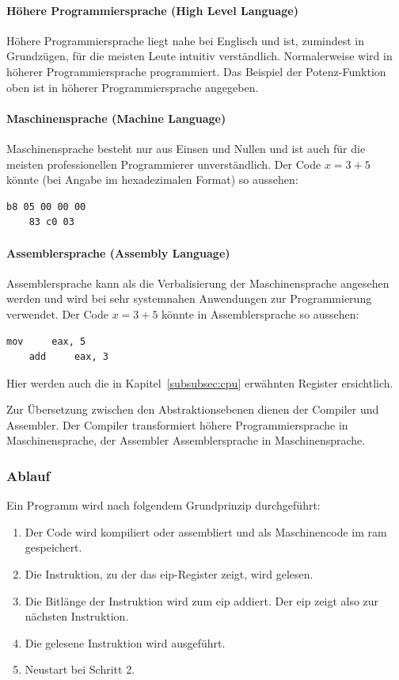 \documentclass[11pt, a4paper]{article}
\begin{document}
\paragraph{Höhere Programmiersprache (High Level Language)}
Höhere Programmiersprache liegt nahe bei Englisch und ist, zumindest in Grundzügen, für die meisten Leute intuitiv verständlich. Normalerweise wird in höherer Programmiersprache programmiert. Das Beispiel der Potenz-Funktion oben ist in höherer Programmiersprache angegeben.
\paragraph{Maschinensprache (Machine Language)}
Maschinensprache besteht nur aus Einsen und Nullen und ist auch für die meisten professionellen Programmierer unverständlich. Der Code \(x = 3 + 5\) könnte (bei Angabe im hexadezimalen Format) so aussehen: 
\begin{lstlisting}[style=LowLevelStyle]
	b8 05 00 00 00
	83 c0 03 
\end{lstlisting}
\paragraph{Assemblersprache (Assembly Language)}
Assemblersprache kann als die Verbalisierung der Maschinensprache angesehen werden und wird bei sehr systemnahen Anwendungen zur Programmierung verwendet. Der Code \(x = 3 + 5\) könnte in Assemblersprache so aussehen: 
\begin{lstlisting}[style=LowLevelStyle]
	mov 	eax, 5
	add 	eax, 3
\end{lstlisting}

Hier werden auch die in Kapitel~\ref{subsubsec:cpu} erwähnten Register ersichtlich.

Zur Übersetzung zwischen den Abstraktionsebenen dienen der Compiler und Assembler. Der Compiler transformiert höhere Programmiersprache in Maschinensprache, der Assembler Assemblersprache in Maschinensprache.

\subsubsection{Ablauf}
Ein Programm wird nach folgendem Grundprinzip durchgeführt:
\begin{enumerate}
	\item Der Code wird kompiliert oder assembliert und als Maschinencode im \gls{ram} gespeichert.
	\item Die Instruktion, zu der das \gls{eip}-Register zeigt, wird gelesen.
	\item Die Bitlänge der Instruktion wird zum \gls{eip} addiert. Der \gls{eip} zeigt also zur nächsten Instruktion.
	\item Die gelesene Instruktion wird ausgeführt.
	\item Neustart bei Schritt 2.
\end{enumerate}
\end{document}
